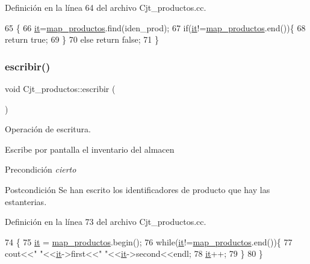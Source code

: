 Definición en la línea 64 del archivo Cjt\+\_\+productos.\+cc.


\begin{DoxyCode}
65 \{
66   \hyperlink{class_cjt__productos_adedbe2194ed053eb446ec367e6d5e60e}{it}=\hyperlink{class_cjt__productos_a44e63c644fdec6cff81dcdb3cf79860c}{map\_productos}.find(iden\_prod);
67   \textcolor{keywordflow}{if}(\hyperlink{class_cjt__productos_adedbe2194ed053eb446ec367e6d5e60e}{it}!=\hyperlink{class_cjt__productos_a44e63c644fdec6cff81dcdb3cf79860c}{map\_productos}.end())\{
68     \textcolor{keywordflow}{return}  \textcolor{keyword}{true};
69   \}
70   \textcolor{keywordflow}{else} \textcolor{keywordflow}{return} \textcolor{keyword}{false}; 
71 \}
\end{DoxyCode}
\mbox{\label{class_cjt__productos_a51582783f3f107f84cc3c5f8cccded36}} 
\subsubsection{\texorpdfstring{escribir()}{escribir()}}
{\footnotesize\ttfamily void Cjt\+\_\+productos\+::escribir (\begin{DoxyParamCaption}{ }\end{DoxyParamCaption})}



Operación de escritura. 

Escribe por pantalla el inventario del almacen \begin{DoxyPrecond}{Precondición}
{\itshape cierto} 
\end{DoxyPrecond}
\begin{DoxyPostcond}{Postcondición}
Se han escrito los identificadores de producto que hay las estanterias. 
\end{DoxyPostcond}


Definición en la línea 73 del archivo Cjt\+\_\+productos.\+cc.


\begin{DoxyCode}
74 \{
75   \hyperlink{class_cjt__productos_adedbe2194ed053eb446ec367e6d5e60e}{it} = \hyperlink{class_cjt__productos_a44e63c644fdec6cff81dcdb3cf79860c}{map\_productos}.begin();
76   \textcolor{keywordflow}{while}(\hyperlink{class_cjt__productos_adedbe2194ed053eb446ec367e6d5e60e}{it}!=\hyperlink{class_cjt__productos_a44e63c644fdec6cff81dcdb3cf79860c}{map\_productos}.end())\{
77     cout<<\textcolor{stringliteral}{"  "}<<\hyperlink{class_cjt__productos_adedbe2194ed053eb446ec367e6d5e60e}{it}->first<<\textcolor{stringliteral}{" "}<<\hyperlink{class_cjt__productos_adedbe2194ed053eb446ec367e6d5e60e}{it}->second<<endl;
78     \hyperlink{class_cjt__productos_adedbe2194ed053eb446ec367e6d5e60e}{it}++;
79  \}
80 \}
\end{DoxyCode}


